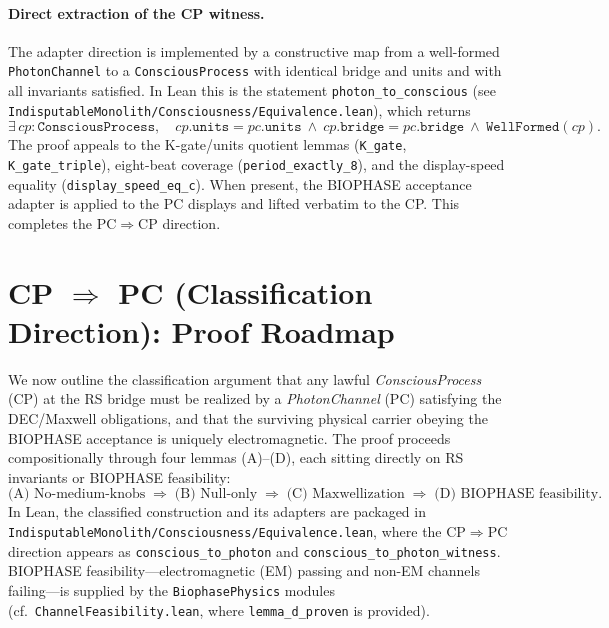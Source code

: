 \documentclass[12pt,a4paper]{article}
\begin{document}
\paragraph{Direct extraction of the CP witness.}
The adapter direction is implemented by a constructive map from a well-formed \texttt{PhotonChannel} to a \texttt{ConsciousProcess} with identical bridge and units and with all invariants satisfied. In Lean this is the statement \texttt{photon\_to\_conscious} (see \texttt{IndisputableMonolith/Consciousness/Equivalence.lean}), which returns
\[
  \exists\, cp:\texttt{ConsciousProcess},\quad
  cp.\texttt{units}=pc.\texttt{units}\ \wedge\ cp.\texttt{bridge}=pc.\texttt{bridge}\ \wedge\ \texttt{WellFormed}(cp).
\]
The proof appeals to the K-gate/units quotient lemmas (\texttt{K\_gate}, \texttt{K\_gate\_triple}), eight-beat coverage (\texttt{period\_exactly\_8}), and the display-speed equality (\texttt{display\_speed\_eq\_c}). When present, the BIOPHASE acceptance adapter is applied to the PC displays and lifted verbatim to the CP. This completes the PC\(\Rightarrow\)CP direction.

\section{CP \texorpdfstring{$\Rightarrow$}{⇒} PC (Classification Direction): Proof Roadmap}
\label{sec:cp-to-pc}

We now outline the classification argument that any lawful \emph{ConsciousProcess} (CP) at the RS bridge must be realized by a \emph{PhotonChannel} (PC) satisfying the DEC/Maxwell obligations, and that the surviving physical carrier obeying the BIOPHASE acceptance is uniquely electromagnetic. The proof proceeds compositionally through four lemmas (A)--(D), each sitting directly on RS invariants or BIOPHASE feasibility:
\[
  \text{(A) No-medium-knobs} \;\Rightarrow\; 
  \text{(B) Null-only} \;\Rightarrow\;
  \text{(C) Maxwellization} \;\Rightarrow\;
  \text{(D) BIOPHASE feasibility}.
\]
In Lean, the classified construction and its adapters are packaged in 
\texttt{IndisputableMonolith/Consciousness/Equivalence.lean}, where the CP$\Rightarrow$PC direction appears as \texttt{conscious\_to\_photon} and \texttt{conscious\_to\_photon\_witness}. BIOPHASE feasibility---electromagnetic (EM) passing and non-EM channels failing---is supplied by the \texttt{BiophasePhysics} modules (cf.\ \texttt{ChannelFeasibility.lean}, where \texttt{lemma\_d\_proven} is provided).
\end{document}
